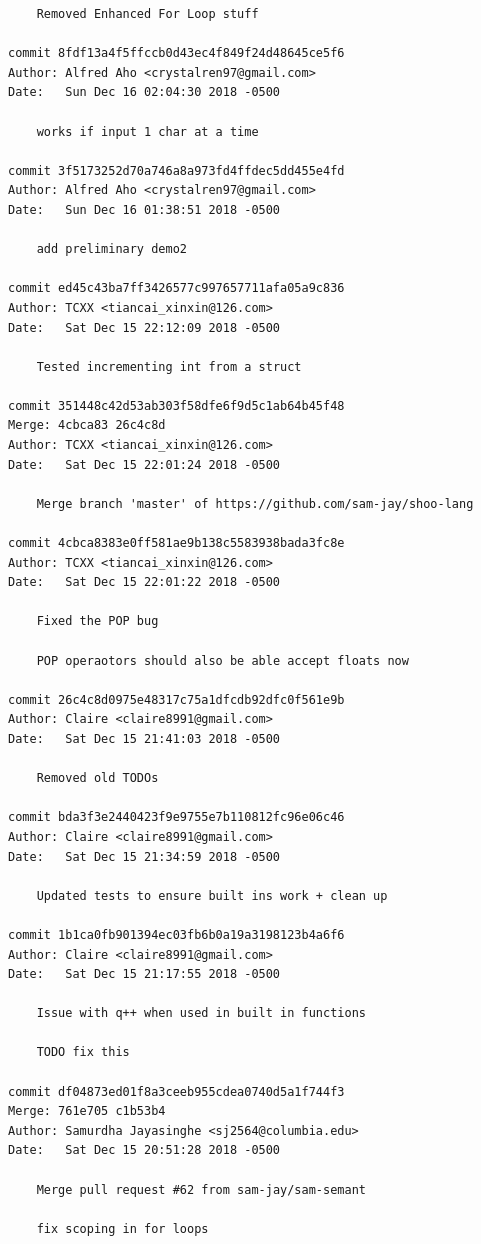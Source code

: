 \documentclass[12pt]{article}
\begin{document}
\begin{lstlisting}
    Removed Enhanced For Loop stuff

commit 8fdf13a4f5ffccb0d43ec4f849f24d48645ce5f6
Author: Alfred Aho <crystalren97@gmail.com>
Date:   Sun Dec 16 02:04:30 2018 -0500

    works if input 1 char at a time

commit 3f5173252d70a746a8a973fd4ffdec5dd455e4fd
Author: Alfred Aho <crystalren97@gmail.com>
Date:   Sun Dec 16 01:38:51 2018 -0500

    add preliminary demo2

commit ed45c43ba7ff3426577c997657711afa05a9c836
Author: TCXX <tiancai_xinxin@126.com>
Date:   Sat Dec 15 22:12:09 2018 -0500

    Tested incrementing int from a struct

commit 351448c42d53ab303f58dfe6f9d5c1ab64b45f48
Merge: 4cbca83 26c4c8d
Author: TCXX <tiancai_xinxin@126.com>
Date:   Sat Dec 15 22:01:24 2018 -0500

    Merge branch 'master' of https://github.com/sam-jay/shoo-lang

commit 4cbca8383e0ff581ae9b138c5583938bada3fc8e
Author: TCXX <tiancai_xinxin@126.com>
Date:   Sat Dec 15 22:01:22 2018 -0500

    Fixed the POP bug
    
    POP operaotors should also be able accept floats now

commit 26c4c8d0975e48317c75a1dfcdb92dfc0f561e9b
Author: Claire <claire8991@gmail.com>
Date:   Sat Dec 15 21:41:03 2018 -0500

    Removed old TODOs

commit bda3f3e2440423f9e9755e7b110812fc96e06c46
Author: Claire <claire8991@gmail.com>
Date:   Sat Dec 15 21:34:59 2018 -0500

    Updated tests to ensure built ins work + clean up

commit 1b1ca0fb901394ec03fb6b0a19a3198123b4a6f6
Author: Claire <claire8991@gmail.com>
Date:   Sat Dec 15 21:17:55 2018 -0500

    Issue with q++ when used in built in functions
    
    TODO fix this

commit df04873ed01f8a3ceeb955cdea0740d5a1f744f3
Merge: 761e705 c1b53b4
Author: Samurdha Jayasinghe <sj2564@columbia.edu>
Date:   Sat Dec 15 20:51:28 2018 -0500

    Merge pull request #62 from sam-jay/sam-semant
    
    fix scoping in for loops


\end{lstlisting}
\end{document}
